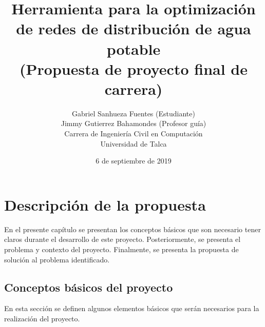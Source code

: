 \documentclass[11pt,letterpaper]{article}
\begin{document}
\pagestyle{empty}

\title{
Herramienta para la optimización de redes de distribución de agua potable\\
(Propuesta de proyecto final de carrera)
}
\author{
Gabriel Sanhueza Fuentes (Estudiante)\\
Jimmy Gutierrez Bahamondes (Profesor guía)\\
Carrera de Ingeniería Civil en Computación\\ 
Universidad de Talca}
\date{6 de septiembre de 2019}

\maketitle


\section{Descripción de la propuesta}


En el presente capítulo se presentan los conceptos básicos que son necesario tener claros durante el desarrollo de este proyecto. Posteriormente, se presenta el problema y contexto del proyecto. Finalmente, se presenta la propuesta de solución al problema identificado.
\subsection{Conceptos básicos del proyecto} 

En esta sección se definen algunos elementos básicos que serán necesarios para la realización del proyecto.
\end{document}

